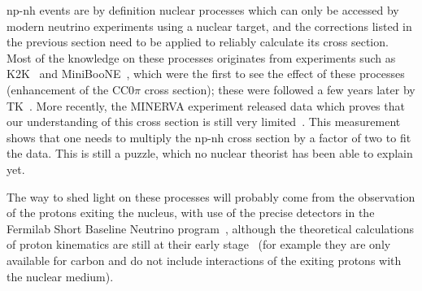 np-nh events are by definition nuclear processes which can only be
accessed by modern neutrino experiments using a nuclear target, and
the corrections listed in the previous section need to be applied to
reliably calculate its cross section. Most of the knowledge on these
processes originates from experiments such as \Gls{K2K}~\cite{K2KCCQE}
and \Gls{MiniBooNE}~\cite{MiniBooNENuCCQE,MiniBooNEANuCCQE}, which
were the first to see the effect of these processes (enhancement of
the \Gls{CC}$0\pi$ cross section); these were followed a few years
later by \Gls{TK}~\cite{T2KCCQE}. More recently, the \Gls{MINERVA}
experiment released data which proves that our understanding of this
cross section is still very limited~\cite{minervaq3q0}. This
measurement shows that one needs to multiply the np-nh cross section
by a factor of two to fit the data. This is still a puzzle, which no
nuclear theorist has been able to explain yet.

The way to shed light on these processes will probably come from the
observation of the protons exiting the nucleus, with use of the
precise detectors in the Fermilab Short Baseline Neutrino
program~\cite{SBN,microboone}, although the theoretical calculations
of proton kinematics are still at their early
stage~\cite{MartiniProtonKine} (for example they are only available
for carbon and do not include interactions of the exiting protons with
the nuclear medium).



